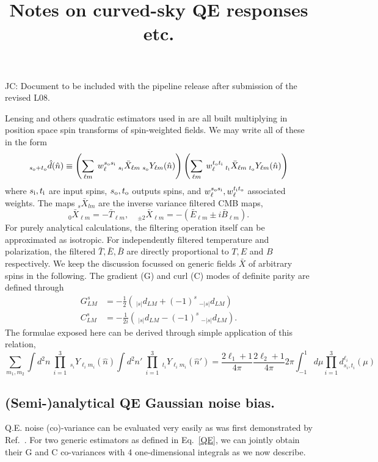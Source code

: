 \documentclass{article}
\newcommand{\si}[0]{{s_{\rm i}}}
\newcommand{\ti}[0]{{t_{\rm i}}}
\newcommand{\so}[0]{{s_{\rm o}}}
\renewcommand{\to}[0]{{t_{\rm o}}}
\newcommand{\JC}[1]{\color{red}JC: #1\color{black}}
\newcommand{\hn}[0]{\hat n}
\begin{document}
\title{Notes on curved-sky QE responses etc.}
\maketitle
\tableofcontents
\vspace{1cm}
\JC{Document to be included with the pipeline release after submission of the revised L08.}

Lensing and others quadratic estimators used in \cite{??} are all built multiplying in position space spin transforms of spin-weighted fields. We may write all of these in the form \begin{equation}\label{QE}
 _{\so + \to}\hat d(\hn) \equiv  \left(\sum_{\ell m}\: w^{\so\si}_\ell \:_{\si} \bar X_{\ell m} \:_\so Y_{\ell m}(\hn)\right)\left(\sum_{\ell m}\:w^{\to\ti}_\ell  \:_{\ti} \bar X_{\ell m} \:_\to Y_{\ell m}(\hn)\right)
\end{equation}
where $\si, \ti$ are input spins, $\so, \to$ outputs spins, and $w_\ell^{\so\si}, w_\ell^{\ti\to}$ associated weights. The maps $_s \bar X_{lm}$ are the inverse variance filtered CMB maps,
\begin{equation}
	_0 \bar X_{\ell m} = -\bar T_{\ell m} , \quad _{\pm 2} \bar X_{\ell m} = -\left(\bar E_{\ell m} \pm i\bar B_{\ell m} \right).
\end{equation}
For purely analytical calculations, the filtering operation itself can be approximated as isotropic. For independently filtered temperature and polarization, the filtered $\bar T, \bar E, \bar B$ are directly proportional to $T, E$ and $B$ respectively. 
We keep the discussion focussed on generic fields $\bar X$ of arbitrary spins in the following. The gradient (G) and curl (C) modes of definite parity are defined through
\begin{eqnarray*}
		G^{s}_{LM} &= -\frac 12\left(\:_{|s|} d_{LM} + (-1)^s \:_{-|s|} d_{LM}\right)  \\
		C^{s}_{LM} &=-\frac 1{2i} \left( \:_{|s|} d_{LM} - (-1)^s \:_{-|s|} d_{LM} \right) .
\end{eqnarray*}
The formulae exposed here can be derived through simple application of this relation,
\begin{equation}
\sum_{m_1,m_2}\int d^2n\: \prod_{i = 1}^3\:_{s_i} Y_{\ell_i m_i}(\hn)\int d^2n'\: \prod_{i = 1}^3\:_{t_i} Y_{\ell_i m_i}(\hn') = \frac{2\ell_1 + 1}{4\pi}\frac{2\ell_2 + 1} {4\pi} 2\pi \int_{-1}^{1} d\mu \prod_{i = 1}^3 d^{\ell_i}_{s_i, t_i}(\mu)
\end{equation}
\subsection{(Semi-)analytical QE Gaussian noise bias.}
Q.E. noise (co)-variance can be evaluated very easily as was first demonstrated by Ref.~\cite{}. For two generic estimators as defined in Eq.~\eqref{QE}, we can jointly obtain their G and C co-variances with 4 one-dimensional integrals as we now describe.
\end{document}
